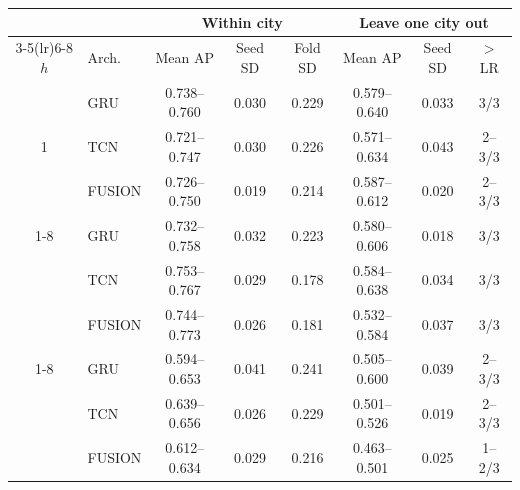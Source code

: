 \begin{tabular}{clcccccc}
\toprule
 & & \multicolumn{3}{c}{Within city} & \multicolumn{3}{c}{Leave one city out} \\
\cmidrule(lr){3-5}\cmidrule(lr){6-8}
$h$ & Arch. & Mean AP & Seed SD & Fold SD & Mean AP & Seed SD & $>$LR \\
\midrule
\multirow{3}{*}{1} & GRU & 0.738--0.760 & 0.030 & 0.229 & 0.579--0.640 & 0.033 & 3/3 \\
 & TCN & 0.721--0.747 & 0.030 & 0.226 & 0.571--0.634 & 0.043 & 2--3/3 \\
 & FUSION & 0.726--0.750 & 0.019 & 0.214 & 0.587--0.612 & 0.020 & 2--3/3 \\
\cmidrule(lr){1-8}
\multirow{3}{*}{12} & GRU & 0.732--0.758 & 0.032 & 0.223 & 0.580--0.606 & 0.018 & 3/3 \\
 & TCN & 0.753--0.767 & 0.029 & 0.178 & 0.584--0.638 & 0.034 & 3/3 \\
 & FUSION & 0.744--0.773 & 0.026 & 0.181 & 0.532--0.584 & 0.037 & 3/3 \\
\cmidrule(lr){1-8}
\multirow{3}{*}{24} & GRU & 0.594--0.653 & 0.041 & 0.241 & 0.505--0.600 & 0.039 & 2--3/3 \\
 & TCN & 0.639--0.656 & 0.026 & 0.229 & 0.501--0.526 & 0.019 & 2--3/3 \\
 & FUSION & 0.612--0.634 & 0.029 & 0.216 & 0.463--0.501 & 0.025 & 1--2/3 \\
\bottomrule
\end{tabular}
